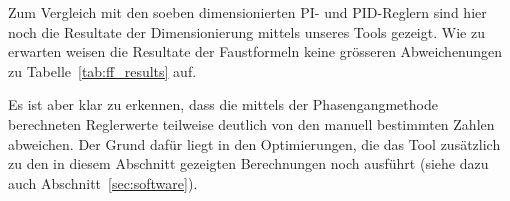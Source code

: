 Zum Vergleich  mit den  soeben dimensionierten PI-  und PID-Reglern  sind hier
noch  die Resultate  der  Dimensionierung mittels  unseres Tools  gezeigt. Wie
zu  erwarten   weisen  die   Resultate  der  Faustformeln   keine  gr\"osseren
Abweichenungen  zu  Tabelle~\ref{tab:ff_results}  auf.

Es  ist  aber  klar  zu  erkennen,  dass  die  mittels  der  Phasengangmethode
berechneten  Reglerwerte   teilweise  deutlich  von  den   manuell  bestimmten
Zahlen  abweichen. Der  Grund daf\"ur  liegt  in  den Optimierungen,  die  das
Tool  zus\"atzlich zu  den  in diesem  Abschnitt  gezeigten Berechnungen  noch
ausf\"uhrt (siehe dazu auch Abschnitt~\ref{sec:software}).


%
